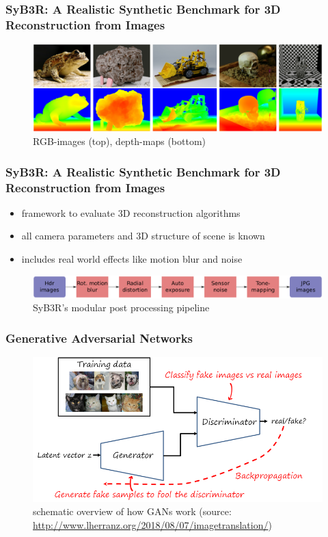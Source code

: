 \documentclass{beamer}
\begin{document}
\begin{frame}
\frametitle{SyB3R: A Realistic Synthetic Benchmark for 3D Reconstruction from Images}
\cite{syb3r}
\begin{figure}
	\includegraphics[width=\linewidth]{../images/SyB3R.png}
	\caption{RGB-images (top), depth-maps (bottom)}
\end{figure}
\end{frame}

\begin{frame}
\frametitle{SyB3R: A Realistic Synthetic Benchmark for 3D Reconstruction from Images}

\begin{itemize}
	\item framework to evaluate 3D reconstruction algorithms
	\item all camera parameters and 3D structure of scene is known
	\item includes real world effects like motion blur and noise
\end{itemize}
\begin{figure}
	\includegraphics[width=\linewidth]{../images/SyB3R_pp.png}
	\caption{SyB3R's modular post processing pipeline}
\end{figure}

\end{frame}

\begin{frame}
\frametitle{Generative Adversarial Networks}
	\begin{figure}
		\includegraphics[width=0.9\linewidth]{../images/GAN.png}
		\caption{schematic overview of how GANs work (source: \href{http://www.lherranz.org/2018/08/07/imagetranslation/}{http://www.lherranz.org/2018/08/07/imagetranslation/})}
	\end{figure}
\end{frame}
\end{document}
